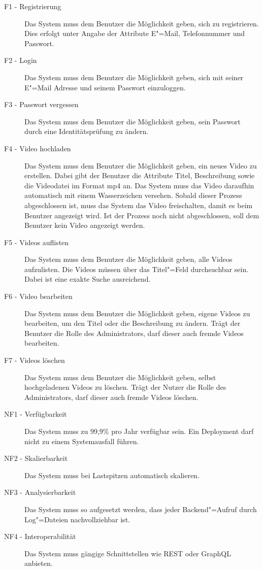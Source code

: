 \begin{description}
   \item[F1 - Registrierung] Das System muss dem Benutzer die Möglichkeit geben, sich zu registrieren. Dies erfolgt unter Angabe der Attribute E"=Mail, Telefonnummer und Passwort. \label{F1}
   \item[F2 - Login] Das System muss dem Benutzer die Möglichkeit geben, sich mit seiner E"=Mail Adresse und seinem Passwort einzuloggen. \label{F2}
   \item[F3 - Passwort vergessen] Das System muss dem Benutzer die Möglichkeit geben, sein Passwort durch eine Identitätsprüfung zu ändern. \label{F3}
   \item[F4 - Video hochladen] Das System muss dem Benutzer die Möglichkeit geben, ein neues Video zu erstellen. Dabei gibt der Benutzer die Attribute Titel, Beschreibung sowie die Videodatei im Format mp4 an. Das System muss das Video daraufhin automatisch mit einem Wasserzeichen versehen. Sobald dieser Prozess abgeschlossen ist, muss das System das Video freischalten, damit es beim Benutzer angezeigt wird. Ist der Prozess noch nicht abgeschlossen, soll dem Benutzer kein Video angezeigt werden. \label{F4}
   \item[F5 - Videos auflisten] Das System muss dem Benutzer die Möglichkeit geben, alle Videos aufzulisten. Die Videos müssen über das Titel"=Feld durchsuchbar sein. Dabei ist eine exakte Suche ausreichend. \label{F5}
   \item[F6 - Video bearbeiten] Das System muss dem Benutzer die Möglichkeit geben, eigene Videos zu bearbeiten, um den Titel oder die Beschreibung zu ändern. Trägt der Benutzer die Rolle des Administrators, darf dieser auch fremde Videos bearbeiten. \label{F6}
   \item[F7 - Videos löschen] Das System muss dem Benutzer die Möglichkeit geben, selbst hochgeladenen Videos zu löschen. Trägt der Nutzer die Rolle des Administrators, darf dieser auch fremde Videos löschen. \label{F7}
   \item[NF1 - Verfügbarkeit] Das System muss zu 99,9\% pro Jahr verfügbar sein. Ein Deployment darf nicht zu einem Systemausfall führen.\label{NF1}
   \item[NF2 - Skalierbarkeit] Das System muss bei Lastspitzen automatisch skalieren.\label{NF2}
   \item[NF3 - Analysierbarkeit] Das System muss so aufgesetzt werden, dass jeder Backend"=Aufruf durch Log"=Dateien nachvollziehbar ist.\label{NF3}
   \item[NF4 - Interoperabilität] Das System muss gängige Schnittstellen wie REST oder GraphQL anbieten.\label{NF4}

\end{description}
